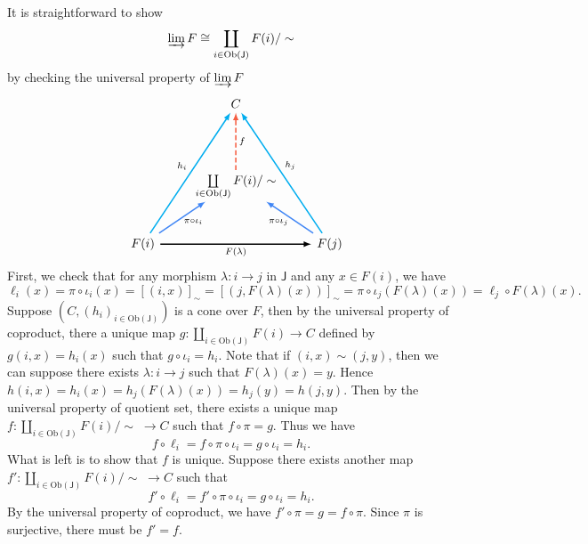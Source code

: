 \begin{prf} 
    It is straightforward to show
    \[
        \varinjlim F\cong\coprod_{i\in \mathrm{Ob}(\mathsf{J})}F(i)/\sim
    \]
    by checking the universal property of $\varinjlim F$
    \[
        \begin{tikzcd}[ampersand replacement=\&, every arrow/.append style={-latex, line width=1.1pt}]
            \&   [-1.5em]                \&[-0em] C \& [-0em]                  \\[+1cm]
            \&                   \& \coprod\limits_{i\in \mathrm{Ob}(\mathsf{J})}F(i)/\sim \arrow[u, "f"', dash pattern=on 4pt off 2pt, draw=arrowRed]         \&                   \\[+0.2cm]
        \& F(i) \arrow[ruu, draw=cyan, "h_i"]\arrow[ru, draw=arrowBlue, shorten >=-3.5pt, "\pi\circ \iota_i"' yshift=2.5pt]        \arrow[rr, "F(\lambda)"']\&   \& F(j)\arrow[luu, draw=cyan, "h_j"']\arrow[lu, draw=arrowBlue, shorten >=-3.7pt, "\pi\circ \iota_j" yshift=2.5pt] 
        \end{tikzcd}
    \]
   First, we check that for any morphism $\lambda:i\to j$ in $\mathsf{J}$ and any $x\in F(i)$, we have
   \[
   \ell_i(x)= \pi\circ \iota_i(x)=[(i,x)]_\sim=[(j,F(\lambda)(x))]_\sim=\pi\circ \iota_j(F(\lambda)(x))=\ell_j\circ F(\lambda)(x).
   \]
   Suppose $(C,(h_i)_{i\in \mathrm{Ob}(\mathsf{J})})$ is a cone over $F$, then by the universal property of coproduct, there a unique map $g:\coprod\limits_{i\in \mathrm{Ob}(\mathsf{J})}F(i)\to C$ defined by $g(i,x)=h_i(x)$ such that $g\circ \iota_i =h_i$. Note that if $(i,x)\sim (j,y)$, then we can suppose there exists $\lambda:i\to j$ such that $F(\lambda)(x)=y$. Hence $h(i,x) = h_i(x)=h_j(F(\lambda)(x))=h_j(y)=
   h(j,y)$. Then by the universal property of quotient set, there exists a unique map $f:\coprod\limits_{i\in \mathrm{Ob}(\mathsf{J})}F(i)/\sim\;\to C$ such that $f\circ \pi=g$. Thus we have
   \[
   f\circ \ell_i=f\circ \pi\circ \iota_i=g\circ \iota_i=h_i.
   \]
   What is left is to show that $f$ is unique. Suppose there exists another map $f':\coprod\limits_{i\in \mathrm{Ob}(\mathsf{J})}F(i)/\sim\;\to C$ such that 
   \[
   f'\circ \ell_i=f'\circ \pi\circ \iota_i=g\circ \iota_i=h_i.
   \]
   By the universal property of coproduct, we have $f'\circ \pi=g=f\circ \pi$. Since $\pi$ is surjective, there must be $f'=f$.
\end{prf}

